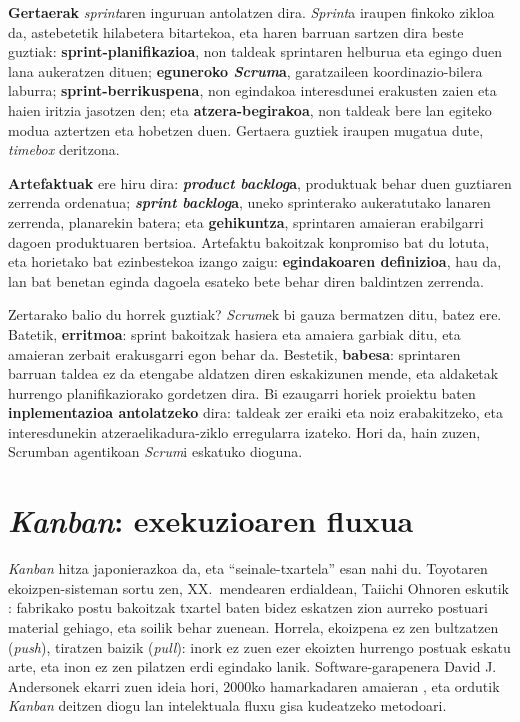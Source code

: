 \textbf{Gertaerak} \textit{sprint}aren inguruan antolatzen dira.
\textit{Sprint}a iraupen finkoko zikloa da, astebetetik hilabetera bitartekoa, eta haren barruan sartzen dira beste guztiak:
\textbf{sprint-planifikazioa}, non taldeak sprintaren helburua eta egingo duen lana aukeratzen dituen;
\textbf{eguneroko \textit{Scrum}a}, garatzaileen koordinazio-bilera laburra;
\textbf{sprint-berrikuspena}, non egindakoa interesdunei erakusten zaien eta haien iritzia jasotzen den;
eta \textbf{atzera-begirakoa}, non taldeak bere lan egiteko modua aztertzen eta hobetzen duen.
Gertaera guztiek iraupen mugatua dute, \textit{timebox} deritzona.

\textbf{Artefaktuak} ere hiru dira:
\textbf{\textit{product backlog}a}, produktuak behar duen guztiaren zerrenda ordenatua;
\textbf{\textit{sprint backlog}a}, uneko sprinterako aukeratutako lanaren zerrenda, planarekin batera;
eta \textbf{gehikuntza}, sprintaren amaieran erabilgarri dagoen produktuaren bertsioa.
Artefaktu bakoitzak konpromiso bat du lotuta, eta horietako bat ezinbestekoa izango zaigu: \textbf{egindakoaren definizioa}, hau da, lan bat benetan eginda dagoela esateko bete behar diren baldintzen zerrenda.

Zertarako balio du horrek guztiak?
\textit{Scrum}ek bi gauza bermatzen ditu, batez ere.
Batetik, \textbf{erritmoa}: sprint bakoitzak hasiera eta amaiera garbiak ditu, eta amaieran zerbait erakusgarri egon behar da.
Bestetik, \textbf{babesa}: sprintaren barruan taldea ez da etengabe aldatzen diren eskakizunen mende, eta aldaketak hurrengo planifikaziorako gordetzen dira.
Bi ezaugarri horiek proiektu baten \textbf{inplementazioa antolatzeko} dira: taldeak zer eraiki eta noiz erabakitzeko, eta interesdunekin atzeraelikadura-ziklo erregularra izateko.
Hori da, hain zuzen, Scrumban agentikoan \textit{Scrum}i eskatuko dioguna.

\section{\textit{Kanban}: exekuzioaren fluxua}

\textit{Kanban} hitza japonierazkoa da, eta ``seinale-txartela'' esan nahi du.
Toyotaren ekoizpen-sisteman sortu zen, XX.~mendearen erdialdean, Taiichi Ohnoren eskutik \parencite{ohno1988toyota}: fabrikako postu bakoitzak txartel baten bidez eskatzen zion aurreko postuari material gehiago, eta soilik behar zuenean.
Horrela, ekoizpena ez zen bultzatzen (\textit{push}), tiratzen baizik (\textit{pull}): inork ez zuen ezer ekoizten hurrengo postuak eskatu arte, eta inon ez zen pilatzen erdi egindako lanik.
Software-garapenera David J. Andersonek ekarri zuen ideia hori, 2000ko hamarkadaren amaieran \parencite{anderson2010kanban}, eta ordutik \textit{Kanban} deitzen diogu lan intelektuala fluxu gisa kudeatzeko metodoari.

